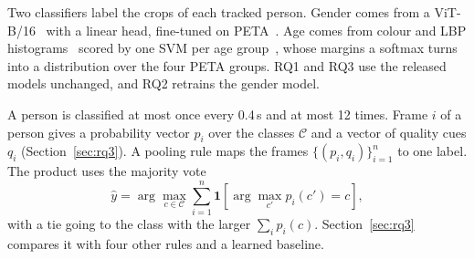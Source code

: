 Two classifiers label the crops of each tracked person. Gender comes from a
ViT-B/16~\cite{dosovitskiy2021vit} with a linear head, fine-tuned on
PETA~\cite{deng2014peta}. Age comes from colour and LBP
histograms~\cite{ojala2002lbp,swain1991color} scored by one SVM per age
group~\cite{cortes1995svm}, whose margins a softmax turns into a distribution
over the four PETA groups. RQ1 and RQ3 use the released models unchanged, and
RQ2 retrains the gender model.

A person is classified at most once every 0.4\,s and at most 12 times. Frame $i$
of a person gives a probability vector $p_i$ over the classes $\mathcal{C}$ and a
vector of quality cues $q_i$ (Section~\ref{sec:rq3}). A pooling rule maps the
frames $\{(p_i, q_i)\}_{i=1}^{n}$ to one label. The product uses the majority
vote
\begin{equation}
\hat{y} = \arg\max_{c \in \mathcal{C}} \sum_{i=1}^{n}
  \mathbf{1}\!\left[\arg\max_{c'} p_i(c') = c\right],
\label{eq:majority}
\end{equation}
with a tie going to the class with the larger $\sum_i p_i(c)$.
Section~\ref{sec:rq3} compares it with four other rules and a learned baseline.
